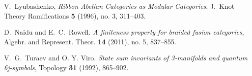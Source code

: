 \documentclass{amsart}
\begin{document}
\begin{thebibliography}{9999}





 V.\ Lyubashenko, \emph{Ribbon Abelian Categories as Modular Categories}, J.\ Knot Theory Ramifications \textbf{5} (1996), no. 3, 311--403.

 D.\ Naidu and E.\ C.\ Rowell. \emph{A finiteness property for braided fusion categories}, Algebr. and Represent. Theor. \textbf{14} (2011), no. 5, 837--855.





 V.\ G.\ Turaev and O. Y. Viro. {\em State sum invariants of 3-manifolds and quantum 6j-symbols}, Topology \textbf{31} (1992), 865--902.






\end{thebibliography}
\end{document}
